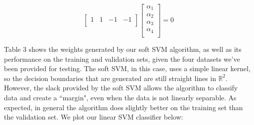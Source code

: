 \documentclass[10pt]{article}
\begin{document}
\[
\begin{bmatrix}
    1 & 1 & -1 & -1 \\
\end{bmatrix}
\begin{bmatrix}
    \alpha_1 \\
    \alpha_2 \\
    \alpha_3 \\
    \alpha_4 \\
\end{bmatrix} 
= 0
\]

Table 3 shows the weights generated by our soft SVM algorithm, as well as its performance on the training and validation sets, given the four datasets we've been provided for testing. The soft SVM, in this case, uses a simple linear kernel, so the decision boundaries that are generated are still straight lines in $\mathbb{R}^2$. However, the slack provided by the soft SVM allows the algorithm to classify data and create a ``margin", even when the data is not linearly separable. As expected, in general the algorithm does slightly better on the training set than the validation set. We plot our linear SVM classifier below:
\end{document}
